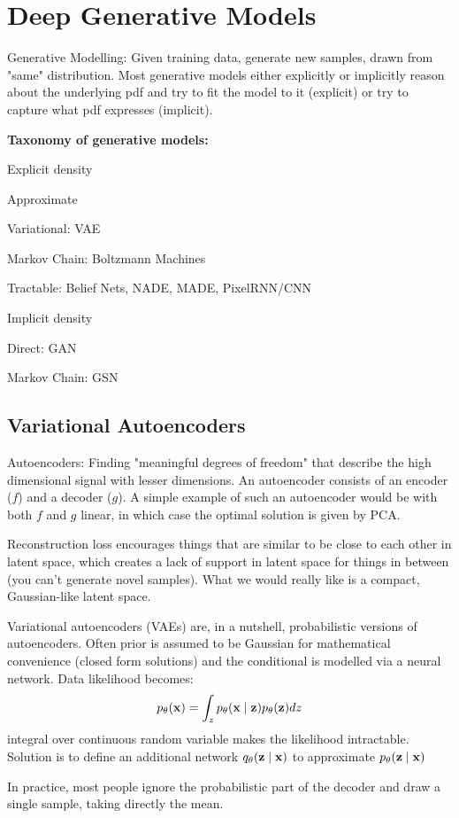 \documentclass[12pt]{article}
\begin{document}
\section{Deep Generative Models}
Generative Modelling: Given training data, generate new samples, drawn from "same" distribution. Most generative models either explicitly or implicitly reason about the underlying pdf and try to fit the model to it (explicit) or try to capture what pdf expresses (implicit).
\par \textbf{Taxonomy of generative models:}
\ulb

\item Explicit density 
\ulb
\item Approximate
\ulb
\item Variational: VAE
\item Markov Chain: Boltzmann Machines
\ule
\item Tractable: Belief Nets, NADE, MADE, PixelRNN/CNN
\ule

\item Implicit density
\ulb
\item Direct: GAN
\item Markov Chain: GSN
\ule

\ule

\subsection{Variational Autoencoders}
Autoencoders: Finding "meaningful degrees of freedom" that describe the high dimensional signal with lesser dimensions. An autoencoder consists of an encoder ($f$) and a decoder ($g$). A simple example of such an autoencoder would be with both $f$ and $g$ linear, in which case the optimal solution is given by PCA.
\par Reconstruction loss encourages things that are similar to be close to each other in latent space, which creates a lack of support in latent space for things in between (you can't generate novel samples). What we would really like is a compact, Gaussian-like latent space.
\par Variational autoencoders (VAEs) are, in a nutshell, probabilistic versions of autoencoders. Often prior is assumed to be Gaussian for mathematical convenience (closed form solutions) and the conditional is modelled via a neural network. Data likelihood becomes:
\[ p_{\theta}(\mathbf{x}) = \int_z p_{\theta}(\mathbf{x}\mid \mathbf{z}) p_{\theta}(\mathbf{z})dz \]
integral over continuous random variable makes the likelihood intractable. Solution is to define an additional network $q_{\theta}(\mathbf{z}\mid \mathbf{x})$ to approximate $p_{\theta}(\mathbf{z}\mid \mathbf{x})$
\par In practice, most people ignore the probabilistic part of the decoder and draw a single sample, taking directly the mean.
\end{document}
